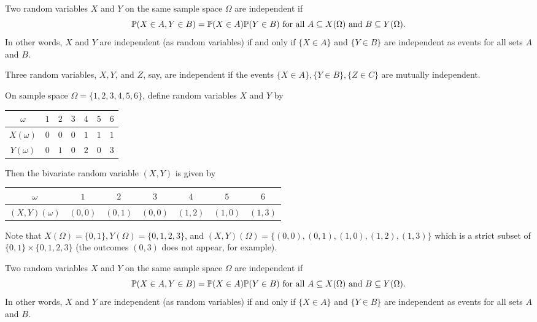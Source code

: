 \documentclass[10pt, a4paper]{article}
\begin{document}
\begin{definition}
    Two random variables $X$ and $Y$ on the same sample space $\Omega$ are independent if
    \[
    \P(X \in A, Y \in B) = \P(X \in A)\P(Y \in B)\text{ for all } A \subseteq X(\Omega)\text{ and } B \subseteq Y(\Omega).
    \]
    In other words,
    $X$ and $Y$ are independent (as random variables) if and only if $\{X \in A\}$ and $\{Y \in B\}$ are independent as events for all sets $A$ and $B$.
\end{definition}

Three random variables,
$X, Y$, and $Z$,
say, are independent if the events $\{X \in A\}, \{Y \in B\}, \{Z \in C\}$ are mutually independent.

\begin{example}
    On sample space $\Omega = \{1, 2, 3, 4, 5, 6\}$,
    define random variables $X$ and $Y$ by
    \begin{table}[H]
        \centering
        \begin{tabular}{c|cccccc}
             $\omega$ & $1$ & $2$ & $3$ & $4$ & $5$ & $6$ \\
             \hline
             $X(\omega)$ & $0$ & $0$ & $0$ & $1$ & $1$ & $1$ \\
             $Y(\omega)$ & $0$ & $1$ & $0$ & $2$ & $0$ & $3$
        \end{tabular}
    \end{table}
    Then the bivariate random variable $(X, Y)$ is given by
    \begin{table}[H]
        \centering
        \begin{tabular}{c|cccccc}
             $\omega$ & $1$ & $2$ & $3$ & $4$ & $5$ & $6$ \\
             \hline
             $(X, Y)(\omega)$ & $(0, 0)$ & $(0, 1)$ & $(0, 0)$ & $(1, 2)$ & $(1, 0)$ & $(1, 3)$
        \end{tabular}
    \end{table}
    Note that $X(\Omega) = \{0, 1\}, Y(\Omega) = \{0, 1, 2, 3\}$,
    and $(X, Y)(\Omega) = \{(0, 0), (0, 1), (1, 0), (1, 2), (1, 3)\}$ which is a strict subset of $\{0, 1\} \times \{0, 1, 2, 3\}$
    (the outcomes $(0, 3)$ does not appear, for example).
\end{example}

\begin{definition}
    Two random variables $X$ and $Y$ on the same sample space $\Omega$ are independent if
    \[
    \P(X \in A, Y \in B) = \P(X \in A)\P(Y \in B)\text{ for all } A \subseteq X(\Omega) \text{ and } B \subseteq Y(\Omega).
    \]
    In other words,
    $X$ and $Y$ are independent (as random variables) if and only if $\{X \in A\}$ and $\{Y \in B\}$ are independent as events for all sets $A$ and $B$.
\end{definition}
\end{document}
